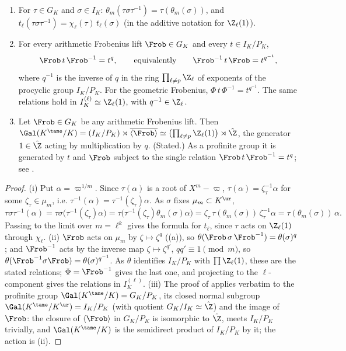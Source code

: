 \begin{theorem}\label{thm:local:tame-relation}
\begin{enumerate}[label=(\roman*)]
\item For $\tau\in G_K$ and $\sigma\in I_K$: $\theta_m(\tau\sigma\tau^{-1})=\tau(\theta_m(\sigma))$, and $t_\ell(\tau\sigma\tau^{-1})=\chi_\ell(\tau)\,t_\ell(\sigma)$ (in the additive
notation for $\Z_\ell(1)$).
\item For every arithmetic Frobenius lift $\Frob\in G_K$ and every $t\in I_K/P_K$,
\[
\Frob\,t\,\Frob^{-1}=t^{q},\qquad\text{equivalently}\qquad\Frob^{-1}\,t\,\Frob=t^{q^{-1}},
\]
where $q^{-1}$ is the inverse of $q$ in the ring $\prod_{\ell\ne p}\Z_\ell$ of exponents of the procyclic group $I_K/P_K$. For the geometric Frobenius,
$\Phi\,t\,\Phi^{-1}=t^{q^{-1}}$. The same relations hold in $I_K^{(\ell)}\simeq\Z_\ell(1)$, with $q^{-1}\in\Z_\ell$.
\item Let $\Frob\in G_K$ be any arithmetic Frobenius lift. Then $\Gal(K^{\tame}/K)=(I_K/P_K)\rtimes\overline{\langle\Frob\rangle}\simeq\bigl(\prod_{\ell\ne p}\Z_\ell(1)\bigr)\rtimes\hat\Z$,
the generator $1\in\hat\Z$ acting by multiplication by $q$. (Stated.) As a profinite group it is generated by $t$ and $\Frob$ subject to the single
relation $\Frob\,t\,\Frob^{-1}=t^q$; see \cite[Chapter VII, Section 5]{NSW}.
\end{enumerate}
\end{theorem}

\begin{proof}
(i) Put $\alpha=\varpi^{1/m}$. Since $\tau(\alpha)$ is a root of $X^m-\varpi$, $\tau(\alpha)=\zeta_\tau^{-1}\alpha$ for some $\zeta_\tau\in\mu_m$, i.e. $\tau^{-1}(\alpha)=\tau^{-1}(\zeta_\tau)\alpha$. As
$\sigma$ fixes $\mu_m\subset K^{\ur}$,
\[
\tau\sigma\tau^{-1}(\alpha)=\tau\sigma\bigl(\tau^{-1}(\zeta_\tau)\alpha\bigr)=\tau\bigl(\tau^{-1}(\zeta_\tau)\theta_m(\sigma)\alpha\bigr)=\zeta_\tau\,\tau(\theta_m(\sigma))\,\zeta_\tau^{-1}\alpha=\tau(\theta_m(\sigma))\,\alpha .
\]
Passing to the limit over $m=\ell^k$ gives the formula for $t_\ell$, since $\tau$ acts on $\Z_\ell(1)$ through $\chi_\ell$.
(ii) $\Frob$ acts on $\mu_m$ by $\zeta\mapsto\zeta^q$ ((a)), so $\theta(\Frob\,\sigma\,\Frob^{-1})=\theta(\sigma)^q$; and $\Frob^{-1}$ acts by the
inverse map $\zeta\mapsto\zeta^{q'}$, $qq'\equiv1\pmod m$, so $\theta(\Frob^{-1}\sigma\Frob)=\theta(\sigma)^{q^{-1}}$. As $\theta$ identifies $I_K/P_K$ with $\prod\Z_\ell(1)$, these are
the stated relations; $\Phi=\Frob^{-1}$ gives the last one, and projecting to the $\ell$-component gives the relations in $I_K^{(\ell)}$.
(iii) The proof of  applies verbatim to the profinite group $\Gal(K^{\tame}/K)=G_K/P_K$, its closed normal subgroup
$\Gal(K^{\tame}/K^{\ur})=I_K/P_K$ (with quotient $G_K/I_K\simeq\hat\Z$) and the image of $\Frob$: the closure of $\langle\Frob\rangle$ in $G_K/P_K$ is isomorphic to $\hat\Z$, meets
$I_K/P_K$ trivially, and $\Gal(K^{\tame}/K)$ is the semidirect product of $I_K/P_K$ by it; the action is (ii).
\end{proof}

